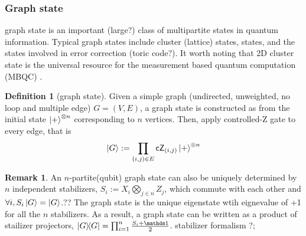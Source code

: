\documentclass[
10pt,
aps,
pra,
linenumbers,
floatfix,
]{revtex4-2}
\theoremstyle{plain}
\newtheorem{question}{Question}
\theoremstyle{definition}
\newtheorem{definition}{Definition}
\newtheorem{remark}{Remark}
\begin{document}
\subsubsection{Graph state}\label{sec:graph_state}
graph state is an important (large?) class of multipartite states in quantum information.
Typical graph states include cluster (lattice) states,  states, and the states involved in error correction (toric code?).
It worth noting that 2D cluster state is the universal resource for the measurement based quantum computation (MBQC) \cite{briegelMeasurementbasedQuantumComputation2009}.
\begin{definition}[graph state]\label{def:graph_state}
	Given a simple graph (undirected, unweighted, no loop and multiple edge) $G=(V,E)$, a graph state is constructed as 
	from the initial state $\ket{+}^{\otimes n}$ corresponding to $n$ vertices.
	Then, apply controlled-Z gate to every edge, that is 
	\begin{equation}
		\ket{G}:=\prod_{(i,j)\in E}\textsf{cZ}_{(i,j)} \ket{+}^{\otimes n}
	\end{equation}
\end{definition}
\begin{remark}
	An $n$-partite(qubit) graph state can also be uniquely determined by $n$ independent stabilizers, 
	$S_i:= X_i \bigotimes_{j\in n}Z_j$, 
	which commute with each other and $\forall i,S_i\ket{G}=\ket{G}$.??
	The graph state is the unique eigenstate wtih eignevalue of +1 for all the $n$ stabilizers.
	As a result, a graph state can be written as a product of stailizer projectors, $\op{G}=\prod_{i=1}^n \frac{S_i +\identity}{2}$.
	stabilizer formalism
	?; 
\end{remark}
\end{document}
